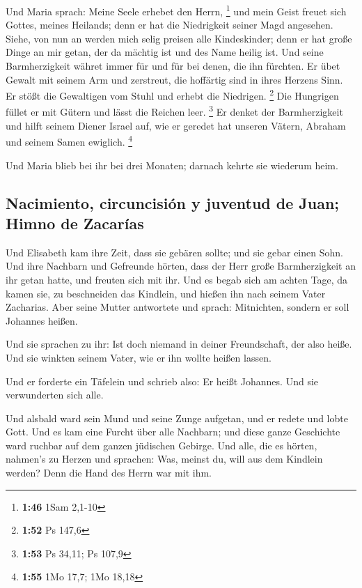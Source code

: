  Und Maria sprach: Meine Seele erhebet den Herrn,
\footnote{\textbf{1:46} 1Sam 2,1-10}  und mein Geist
freuet sich Gottes, meines Heilands;  denn er hat die
Niedrigkeit seiner Magd angesehen. Siehe, von nun an werden mich selig
preisen alle Kindeskinder;  denn er hat große Dinge an
mir getan, der da mächtig ist und des Name heilig ist. 
Und seine Barmherzigkeit währet immer für und für bei denen, die ihn
fürchten.  Er übet Gewalt mit seinem Arm und zerstreut,
die hoffärtig sind in ihres Herzens Sinn.  Er stößt die
Gewaltigen vom Stuhl und erhebt die Niedrigen. \footnote{\textbf{1:52}
  Ps 147,6}  Die Hungrigen füllet er mit Gütern und lässt
die Reichen leer. \footnote{\textbf{1:53} Ps 34,11; Ps 107,9}
 Er denket der Barmherzigkeit und hilft seinem Diener
Israel auf,  wie er geredet hat unseren Vätern, Abraham
und seinem Samen ewiglich. \footnote{\textbf{1:55} 1Mo 17,7; 1Mo 18,18}

 Und Maria blieb bei ihr bei drei Monaten; darnach kehrte
sie wiederum heim.

\hypertarget{nacimiento-circuncisiuxf3n-y-juventud-de-juan-himno-de-zacaruxedas}{%
\subsection{Nacimiento, circuncisión y juventud de Juan; Himno de
Zacarías}\label{nacimiento-circuncisiuxf3n-y-juventud-de-juan-himno-de-zacaruxedas}}

 Und Elisabeth kam ihre Zeit, dass sie gebären sollte;
und sie gebar einen Sohn.  Und ihre Nachbarn und
Gefreunde hörten, dass der Herr große Barmherzigkeit an ihr getan hatte,
und freuten sich mit ihr.  Und es begab sich am achten
Tage, da kamen sie, zu beschneiden das Kindlein, und hießen ihn nach
seinem Vater Zacharias.  Aber seine Mutter antwortete und
sprach: Mitnichten, sondern er soll Johannes heißen.

 Und sie sprachen zu ihr: Ist doch niemand in deiner
Freundschaft, der also heiße.  Und sie winkten seinem
Vater, wie er ihn wollte heißen lassen.

 Und er forderte ein Täfelein und schrieb also: Er heißt
Johannes. Und sie verwunderten sich alle.

 Und alsbald ward sein Mund und seine Zunge aufgetan, und
er redete und lobte Gott.  Und es kam eine Furcht über
alle Nachbarn; und diese ganze Geschichte ward ruchbar auf dem ganzen
jüdischen Gebirge.  Und alle, die es hörten, nahmen's zu
Herzen und sprachen: Was, meinst du, will aus dem Kindlein werden? Denn
die Hand des Herrn war mit ihm.

